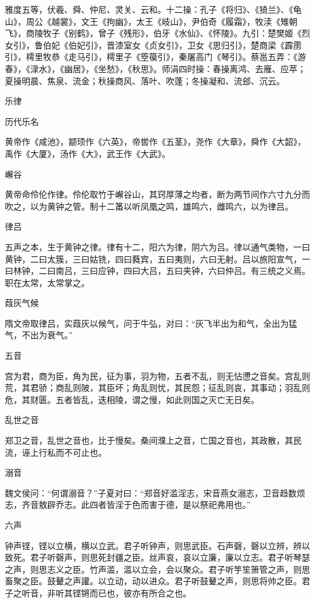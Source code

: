 \documentclass[a4paper,12pt,UTF8,twoside]{ctexbook}
\begin{document}
    雅度五等，伏羲、舜、仲尼、灵关、云和。十二操：孔子《将归》、《猗兰》、《龟山》，周公《越裳》，文王《拘幽》，太王《岐山》，尹伯奇《履霜》，牧渎《雉朝飞》，商陵牧子《别鹤》，曾子《残形》，伯牙《水仙》、《怀陵》。九引：楚樊姬《烈女引》，鲁伯妃《伯妃引》，晋漆室女《贞女引》，卫女《思归引》，楚商梁《霹雳引》，樗里牧恭《走马引》，樗里子《箜篌引》，秦屠高门《琴引》。蔡邕五弄：《游春》，《渌水》，《幽居》，《坐愁》，《秋思》。师涓四时操：春操离鸿、去雁、应苹；夏操明晨、焦泉、流金；秋操商风、落叶、吹蓬；冬操凝和、流郐、沉云。
    
    乐律
    
    历代乐名
    
    黄帝作《咸池》，颛顼作《六英》，帝喾作《五茎》，尧作《大章》，舜作《大韶》，禹作《大厦》，汤作《大》，武王作《大武》。
    
    嶰谷
    
    黄帝命伶伦作律。伶伦取竹于嶰谷山，其窍厚薄之均者，断为两节间作六寸九分而吹之，以为黄钟之管。制十二筩以听凤凰之鸣，雄鸣六，雌鸣六，以为律吕。
    
    律吕
    
    五声之本，生于黄钟之律。律有十二，阳六为律，阴六为吕。律以通气类物，一曰黄钟，二曰太簇，三曰姑铣，四曰蕤宾，五曰夷则，六曰无射。吕以旅阳宣气，一曰林钟，二曰南吕，三曰应钟，四曰大吕，五曰夹钟，六曰仲吕。有三统之义焉。职在太常，太常掌之。
    
    葭灰气候
    
    隋文帝取律吕，实葭灰以候气，问于牛弘，对曰：“灰飞半出为和气，全出为猛气，不出为衰气。”
    
    五音
    
    宫为君，商为臣，角为民，征为事，羽为物，五者不乱，则无怗懘之音矣。宫乱则荒，其君骄；商乱则陂，其臣坏；角乱则忧，其民怨；征乱则哀，其事动；羽乱则危，其财匮。五者皆乱，迭相陵，谓之慢，如此则国之灭亡无日矣。
    
    乱世之音
    
    郑卫之音，乱世之音也，比于慢矣。桑间濮上之音，亡国之音也，其政散，其民流，诬上行私而不可止也。
    
    溺音
    
    魏文侯问：“何谓溺音？”子夏对曰：“郑音好滥淫志，宋音燕女溺志，卫音趋数烦志，齐音敖辟乔志。此四者皆淫于色而害于德，是以祭祀弗用也。”
    
    六声
    
    钟声铿，铿以立横，横以立武。君子听钟声，则思武臣。石声磬，磬以立辨，辨以致死。君子听磬声，则思死封疆之臣。丝声哀，哀以立廉，廉以立志。君子听琴瑟之声，则思志义之臣。竹声滥，滥以立会，会以聚众。君子听竽笙箫管之声，则思畜聚之臣。鼓鼙之声讙。以立动，动以进众。君子听鼓鼙之声，则思将帅之臣。君子之听音，非听其铿锵而已也，彼亦有所合之也。
    
\end{document}
